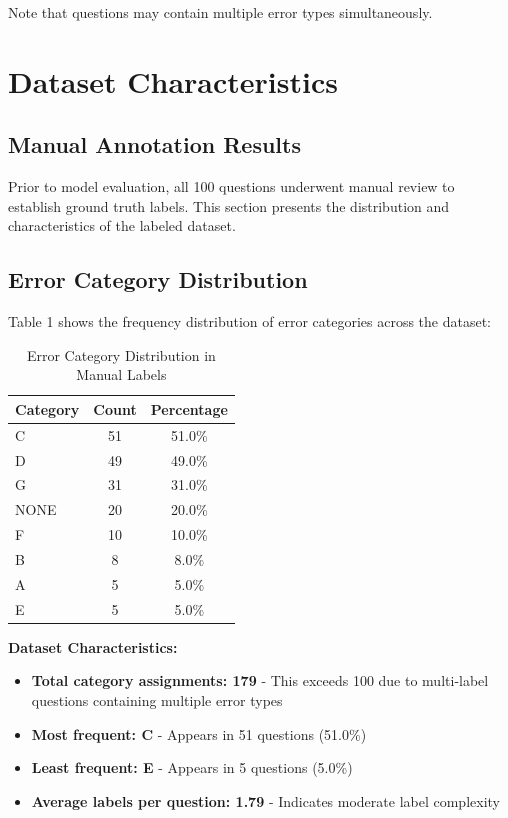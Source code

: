 \documentclass[12pt,a4paper]{article}
\begin{document}
Note that questions may contain multiple error types simultaneously.

\newpage

\section{Dataset Characteristics}

\subsection{Manual Annotation Results}

Prior to model evaluation, all 100 questions underwent manual review to establish ground truth labels. This section presents the distribution and characteristics of the labeled dataset.

\subsection{Error Category Distribution}

Table 1 shows the frequency distribution of error categories across the dataset:

\begin{table}[H]
\centering
\begin{tabular}{lcc}
\toprule
\textbf{Category} & \textbf{Count} & \textbf{Percentage} \\
\midrule
C & 51 & 51.0\% \\
D & 49 & 49.0\% \\
G & 31 & 31.0\% \\
NONE & 20 & 20.0\% \\
F & 10 & 10.0\% \\
B & 8 & 8.0\% \\
A & 5 & 5.0\% \\
E & 5 & 5.0\% \\
\bottomrule
\end{tabular}
\caption{Error Category Distribution in Manual Labels}
\end{table}

\textbf{Dataset Characteristics:}

\begin{itemize}[leftmargin=*]
    \item \textbf{Total category assignments: 179} - This exceeds 100 due to multi-label questions containing multiple error types
    
    \item \textbf{Most frequent: C} - Appears in 51 questions (51.0\%)
    
    \item \textbf{Least frequent: E} - Appears in 5 questions (5.0\%)
    
    \item \textbf{Average labels per question: 1.79} - Indicates moderate label complexity
\end{itemize}
\end{document}
